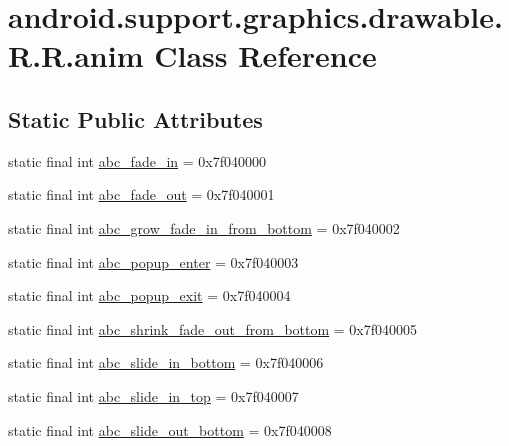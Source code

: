 \hypertarget{classandroid_1_1support_1_1graphics_1_1drawable_1_1_r_1_1anim}{
\section{android.support.graphics.drawable.R.R.anim Class Reference}
\label{classandroid_1_1support_1_1graphics_1_1drawable_1_1_r_1_1anim}
}
\subsection*{Static Public Attributes}
\begin{CompactItemize}
\item 
static final int \hyperlink{classandroid_1_1support_1_1graphics_1_1drawable_1_1_r_1_1anim_02a3e4fae553a22944f8be5499be9f8f}{abc\_\-fade\_\-in} = 0x7f040000
\item 
static final int \hyperlink{classandroid_1_1support_1_1graphics_1_1drawable_1_1_r_1_1anim_0ff7f898cdfeb3424c0111365f19e5ef}{abc\_\-fade\_\-out} = 0x7f040001
\item 
static final int \hyperlink{classandroid_1_1support_1_1graphics_1_1drawable_1_1_r_1_1anim_9f396d0b99aa9a0a2a7ae5bb7adda8d3}{abc\_\-grow\_\-fade\_\-in\_\-from\_\-bottom} = 0x7f040002
\item 
static final int \hyperlink{classandroid_1_1support_1_1graphics_1_1drawable_1_1_r_1_1anim_618fb213751416a43880c0127560ab1a}{abc\_\-popup\_\-enter} = 0x7f040003
\item 
static final int \hyperlink{classandroid_1_1support_1_1graphics_1_1drawable_1_1_r_1_1anim_cd6be5438463c7977e4e8cb967b81b36}{abc\_\-popup\_\-exit} = 0x7f040004
\item 
static final int \hyperlink{classandroid_1_1support_1_1graphics_1_1drawable_1_1_r_1_1anim_fde5f1f5185bd81182a1ab5f9b5de0fd}{abc\_\-shrink\_\-fade\_\-out\_\-from\_\-bottom} = 0x7f040005
\item 
static final int \hyperlink{classandroid_1_1support_1_1graphics_1_1drawable_1_1_r_1_1anim_48b7db030595405ec731f4fda120ea75}{abc\_\-slide\_\-in\_\-bottom} = 0x7f040006
\item 
static final int \hyperlink{classandroid_1_1support_1_1graphics_1_1drawable_1_1_r_1_1anim_193e66e29abd4cc2c2b658b59e760316}{abc\_\-slide\_\-in\_\-top} = 0x7f040007
\item 
static final int \hyperlink{classandroid_1_1support_1_1graphics_1_1drawable_1_1_r_1_1anim_c1ca597bed853171bffe2c5fa41ae519}{abc\_\-slide\_\-out\_\-bottom} = 0x7f040008

\end{CompactItemize}
